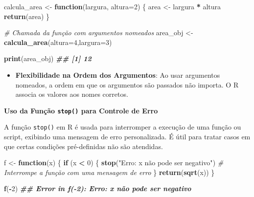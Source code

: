 \documentclass[
]{book}
\newenvironment{Shaded}{\begin{snugshade}}{\end{snugshade}}
\newcommand{\AttributeTok}[1]{\textcolor[rgb]{0.13,0.29,0.53}{#1}}
\newcommand{\CommentTok}[1]{\textcolor[rgb]{0.56,0.35,0.01}{\textit{#1}}}
\newcommand{\ControlFlowTok}[1]{\textcolor[rgb]{0.13,0.29,0.53}{\textbf{#1}}}
\newcommand{\DecValTok}[1]{\textcolor[rgb]{0.00,0.00,0.81}{#1}}
\newcommand{\DocumentationTok}[1]{\textcolor[rgb]{0.56,0.35,0.01}{\textbf{\textit{#1}}}}
\newcommand{\FunctionTok}[1]{\textcolor[rgb]{0.13,0.29,0.53}{\textbf{#1}}}
\newcommand{\NormalTok}[1]{#1}
\newcommand{\OtherTok}[1]{\textcolor[rgb]{0.56,0.35,0.01}{#1}}
\newcommand{\SpecialCharTok}[1]{\textcolor[rgb]{0.81,0.36,0.00}{\textbf{#1}}}
\newcommand{\StringTok}[1]{\textcolor[rgb]{0.31,0.60,0.02}{#1}}
\providecommand{\tightlist}{%
  \setlength{\itemsep}{0pt}\setlength{\parskip}{0pt}}
\begin{document}
\begin{Shaded}
\begin{Highlighting}[]
\NormalTok{calcula\_area }\OtherTok{\textless{}{-}} \ControlFlowTok{function}\NormalTok{(largura, }\AttributeTok{altura=}\DecValTok{2}\NormalTok{) \{ }
\NormalTok{        area }\OtherTok{\textless{}{-}}\NormalTok{ largura }\SpecialCharTok{*}\NormalTok{ altura  }
        \FunctionTok{return}\NormalTok{(area)}
\NormalTok{\}}

\CommentTok{\# Chamada da função com argumentos nomeados}
\NormalTok{area\_obj }\OtherTok{\textless{}{-}} \FunctionTok{calcula\_area}\NormalTok{(}\AttributeTok{altura=}\DecValTok{4}\NormalTok{,}\AttributeTok{largura=}\DecValTok{3}\NormalTok{) }
    
\FunctionTok{print}\NormalTok{(area\_obj)}
\DocumentationTok{\#\# [1] 12}
\end{Highlighting}
\end{Shaded}

\begin{itemize}
\tightlist
\item
  \textbf{Flexibilidade na Ordem dos Argumentos}: Ao usar argumentos
  nomeados, a ordem em que os argumentos são passados não importa. O R
  associa os valores aos nomes corretos.
\end{itemize}

\textbf{Uso da Função \texttt{stop()} para Controle de Erro}

A função \texttt{stop()} em R é usada para interromper a execução de uma função
ou script, exibindo uma mensagem de erro personalizada. É útil para
tratar casos em que certas condições pré-definidas não são atendidas.

\begin{Shaded}
\begin{Highlighting}[]
\NormalTok{f }\OtherTok{\textless{}{-}} \ControlFlowTok{function}\NormalTok{(x) \{}
  \ControlFlowTok{if}\NormalTok{ (x }\SpecialCharTok{\textless{}} \DecValTok{0}\NormalTok{) \{}
    \FunctionTok{stop}\NormalTok{(}\StringTok{"Erro: x não pode ser negativo"}\NormalTok{)  }\CommentTok{\# Interrompe a função com uma mensagem de erro}
\NormalTok{  \}}
  \FunctionTok{return}\NormalTok{(}\FunctionTok{sqrt}\NormalTok{(x))}
\NormalTok{\}}

\FunctionTok{f}\NormalTok{(}\SpecialCharTok{{-}}\DecValTok{2}\NormalTok{)}
\DocumentationTok{\#\# Error in f({-}2): Erro: x não pode ser negativo}
\end{Highlighting}
\end{Shaded}
\end{document}
